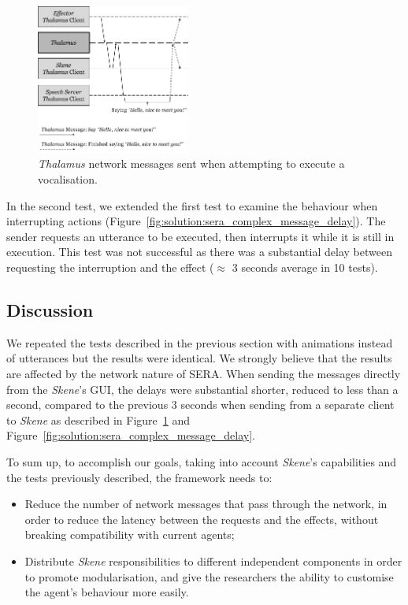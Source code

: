 \begin{figure}[H]
	\centering
	\includegraphics[width=0.45\textwidth]{images/SERA_SimpleTest.png}	
	\caption{\textit{Thalamus} network messages sent when attempting to execute a vocalisation.}
	\label{fig:solution:sera_simple_message_delay}
\end{figure}

In the second test, we extended the first test to examine the behaviour when interrupting actions (Figure~\ref{fig:solution:sera_complex_message_delay}). The sender requests an utterance to be executed, then interrupts it while it is still in execution. This test was not successful as there was a substantial delay between requesting the interruption and the effect ($\approx$ 3 seconds average in 10 tests).

\subsection*{Discussion}

We repeated the tests described in the previous section with animations instead of utterances but the results were identical. We strongly believe that the results are affected by the network nature of \ac{SERA}. When sending the messages directly from the \textit{Skene}'s \ac{GUI}, the delays were substantial shorter, reduced to less than a second, compared to the previous 3 seconds when sending from a separate client to \textit{Skene} as described in Figure~\ref{fig:solution:sera_simple_message_delay} and Figure~\ref{fig:solution:sera_complex_message_delay}.

To sum up, to accomplish our goals, taking into account \textit{Skene}'s capabilities and the tests previously described, the framework needs to:
\begin{itemize}
	\item Reduce the number of network messages that pass through the network, in order to reduce the latency between the requests and the effects, without breaking compatibility with current agents;
	\item Distribute \textit{Skene} responsibilities to different independent components in order to promote modularisation, and give the researchers the ability to customise the agent's behaviour more easily.
\end{itemize}


